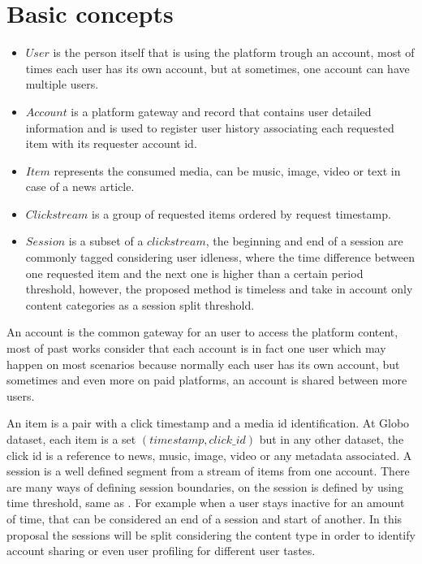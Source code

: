 \documentclass[ecp,tc,english]{iiufrgs}
\begin{document}
    \section{Basic concepts} \label{basic_concepts}
        \begin{itemize}
            \item \(User\) is the person itself that is using the platform trough an account, most of times each user has its own account, but at sometimes, one account can have multiple users.        
            \item \(Account\) is a platform gateway and record that contains user detailed information and is used to register user history associating each requested item with its requester account id.
            \item \(Item\) represents the consumed media, can be music, image, video or text in case of a news article.
            \item \(Clickstream\) is a group of requested items ordered by request timestamp.    
            \item \(Session\) is a subset of a \(clickstream\), the beginning and end of a session are commonly tagged considering user idleness, where the time difference between one requested item and the next one is higher than a certain period threshold, however, the proposed method is timeless and take in account only content categories as a session split threshold.
        \end{itemize}

        An account is the common gateway for an user to access the platform content, most of past works consider that each account is in fact one user which may happen on most scenarios because normally each user has its own account, but sometimes and even more on paid platforms, an account is shared between more users.
    
        An item is a pair with a click timestamp and a media id identification. 
        At Globo dataset, each item is a  set \((timestamp, click\_id)\) but 
        in any other dataset, the click id is a reference to news, music, 
        image, video or any metadata associated. A session is a well defined 
        segment from a stream of items from one account. There are many ways 
        of defining session boundaries, on \cite{arlitt2000} the session 
        is defined by using time threshold, same as \cite{halfaker2015}. 
        For example when a user stays inactive for an amount of time, that can be 
        considered an end of a session and start of another. In this proposal the 
        sessions will be split considering the content type in order to identify 
        account sharing or even user profiling for different user tastes.
\end{document}
